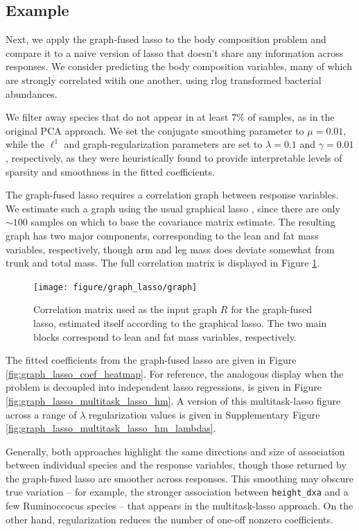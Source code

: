 \documentclass[14pt]{extarticle}
\begin{document}
\subsection{Example}
\label{subsec:graph_fused_example}

Next, we apply the graph-fused lasso to the body composition problem and compare
it to a naive version of lasso that doesn't share any information across
responses. We consider predicting the body composition variables, many of which
are strongly correlated witih one another, using $\text{rlog}$ transformed
bacterial abundances.

We filter away species that do not appear in at least 7\% of samples,
as in the original PCA approach. We set the conjugate smoothing parameter to
$\mu = 0.01$, while the $\ell^{1}$ and graph-regularization parameters are set
to $\lambda = 0.1$ and $\gamma = 0.01$, respectively, as they were heuristically
found to provide interpretable levels of sparsity and smoothness in the fitted
coefficients.

The graph-fused lasso requires a correlation graph between response variables.
We estimate such a graph using the usual graphical lasso
\citep{friedman2008sparse}, since there are only $\sim 100$ samples on which to
base the covariance matrix estimate. The resulting graph has two major
components, corresponding to the lean and fat mass variables, respectively,
though arm and leg mass does deviate somewhat from trunk and total mass. The
full correlation matrix is displayed in Figure \ref{fig:graph_lasso_graph}.

\begin{figure}
  \centering
  \texttt{[image: figure/graph\_lasso/graph]}
  \caption{Correlation matrix used as the input graph $R$ for the graph-fused
    lasso, estimated itself according to the graphical
    lasso. The two main blocks correspond to lean and fat mass variables,
    respectively. \label{fig:graph_lasso_graph} }
\end{figure}

The fitted coefficients from the graph-fused lasso are given in Figure
\ref{fig:graph_lasso_coef_heatmap}. For reference, the analogous display when
the problem is decoupled into independent lasso regressions, is given in Figure
\ref{fig:graph_lasso_multitask_lasso_hm}. A version of this multitask-lasso
figure across a range of $\lambda$ regularization values is given in
Supplementary Figure \ref{fig:graph_lasso_multitask_lasso_hm_lambdas}.

Generally, both approaches highlight the same directions and size
of association between individual species and the response variables, though
those returned by the graph-fused lasso are smoother across responses. This
smoothing may obscure true variation -- for example, the stronger association
between \texttt{height\_dxa} and a few Ruminoccocus species -- that appears in
the multitask-lasso approach. On the other hand, regularization reduces the
number of one-off nonzero coefficients.
\end{document}
